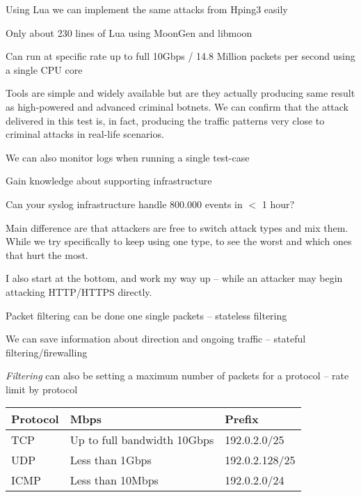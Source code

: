 \documentclass[Screen16to9,17pt]{foils}
\begin{document}
\begin{list2}
\item Using Lua we can implement the same attacks from Hping3 easily
\item Only about 230 lines of Lua using MoonGen and libmoon
\item Can run at specific rate up to full 10Gbps / 14.8 Million packets per second using a single CPU core
\end{list2}



Tools are simple and widely available but are they actually producing same result
as high-powered and advanced criminal botnets. We can confirm that the attack
delivered in this test is, in fact, producing the traffic patterns very close to
criminal attacks in real-life scenarios.

\begin{list2}
\item We can also monitor logs when running a single test-case
\item Gain knowledge about supporting infrastructure
\item Can your syslog infrastructure handle 800.000 events in $<$ 1 hour?
\end{list2}

Main difference are that attackers are free to switch attack types and mix them. While we try specifically to keep using one type, to see the worst and which ones that hurt the most.

I also start at the bottom, and work my way up -- while an attacker may begin attacking HTTP/HTTPS directly.



\begin{list2}
\item Packet filtering can be done one single packets -- stateless filtering
\item We can save information about direction and ongoing traffic -- stateful filtering/firewalling
\item \emph{Filtering} can also be setting a maximum number of packets for a protocol -- rate limit by protocol
\end{list2}



\begin{tabularx}{\textwidth-5cm}{|p{5cm}|p{7cm}|X|} \hline
{\bf Protocol} & {\bf Mbps} & {\bf Prefix}\\\hline
TCP & Up to full bandwidth 10Gbps & 192.0.2.0/25 \\\hline
UDP & Less than 1Gbps & 192.0.2.128/25 \\\hline
ICMP & Less than 10Mbps & 192.0.2.0/24 \\\hline
\end{tabularx}
\end{document}
